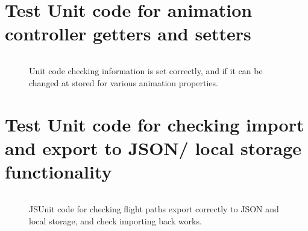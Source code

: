 \section{Test Unit code for animation controller getters and setters}
\label{test:animation}
\begin{figure}[h!]
\caption{Unit code checking information is set correctly, and if it can be changed at stored for various animation properties.}
\begin{lstlisting}
\end{lstlisting}
\end{figure}

\section{Test Unit code for checking import and export to JSON/ local storage functionality}
\label{test:save}
\begin{figure}[h!]
\caption{JSUnit code for checking flight paths export correctly to JSON and local storage, and check importing back works.}
\begin{lstlisting}
\end{lstlisting}
\end{figure}

